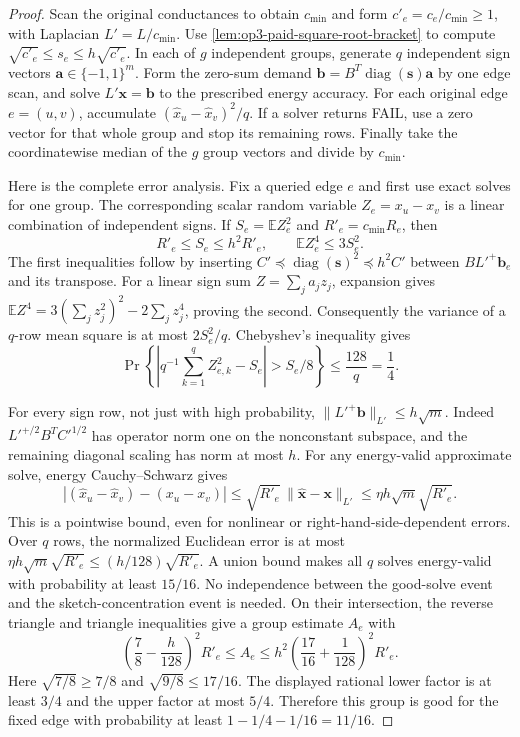 \begin{proof}
Scan the original conductances to obtain $c_{\min}$ and form
$c'_e=c_e/c_{\min}\geq1$, with Laplacian $L'=L/c_{\min}$.
Use \cref{lem:op3-paid-square-root-bracket} to compute
$\sqrt{c'_e}\leq s_e\leq h\sqrt{c'_e}$. In each of $g$ independent
groups, generate $q$ independent sign vectors
$\bm a\in\{-1,1\}^m$. Form the zero-sum demand
$\bm b=B^T\operatorname{diag}(\bm s)\bm a$ by one edge scan, and
solve $L'\bm x=\bm b$ to the prescribed energy accuracy.
For each original edge $e=(u,v)$, accumulate
$(\widehat x_u-\widehat x_v)^2/q$. If a solver returns
\textnormal{FAIL}, use a zero vector for that whole group and stop its
remaining rows. Finally take the coordinatewise median of the $g$
group vectors and divide by $c_{\min}$.

Here is the complete error analysis. Fix a queried edge $e$ and first
use exact solves for one group. The corresponding scalar random variable
$Z_e=x_u-x_v$ is a linear combination of independent signs. If
$S_e=\mathbb E Z_e^2$ and $R'_e=c_{\min}R_e$, then
\[
 R'_e\leq S_e\leq h^2R'_e,
 \qquad \mathbb E Z_e^4\leq3S_e^2.
\]
The first inequalities follow by inserting
$C'\preceq\operatorname{diag}(\bm s)^2\preceq h^2C'$
between $B L'^+\bm b_e$ and its transpose. For a linear sign sum
$Z=\sum_j a_j z_j$, expansion gives
$\mathbb E Z^4=3(\sum_jz_j^2)^2-2\sum_jz_j^4$, proving the second.
Consequently the variance of a $q$-row mean square is at most
$2S_e^2/q$. Chebyshev's inequality gives
\[
 \Pr\left\{\left|q^{-1}\sum_{k=1}^q Z_{e,k}^2-S_e\right|
       >S_e/8\right\}\leq\frac{128}{q}=\frac14.
\]

For every sign row, not just with high probability,
$\|L'^+\bm b\|_{L'}\leq h\sqrt m$. Indeed
$L'^{+/2}B^TC'^{1/2}$ has operator norm one on the nonconstant
subspace, and the remaining diagonal scaling has norm at most $h$.
For any energy-valid approximate solve, energy Cauchy--Schwarz gives
\[
 |(\widehat x_u-\widehat x_v)-(x_u-x_v)|
 \leq\sqrt{R'_e}\,\|\widehat{\bm x}-\bm x\|_{L'}
 \leq\eta h\sqrt m\sqrt{R'_e}.
\]
This is a pointwise bound, even for nonlinear or right-hand-side-dependent
errors. Over $q$ rows, the normalized Euclidean error is at most
$\eta h\sqrt m\sqrt{R'_e}\leq(h/128)\sqrt{R'_e}$.
A union bound makes all $q$ solves energy-valid with probability at
least $15/16$. No independence between the good-solve event and the
sketch-concentration event is needed. On their intersection, the reverse
triangle and triangle inequalities give a group estimate $A_e$ with
\[
 \left(\frac78-\frac h{128}\right)^2R'_e
 \leq A_e\leq h^2\left(\frac{17}{16}+\frac1{128}\right)^2R'_e.
\]
Here $\sqrt{7/8}\geq7/8$ and $\sqrt{9/8}\leq17/16$.
The displayed rational lower factor is at least $3/4$ and the upper
factor at most $5/4$. Therefore this group is good for the fixed edge
with probability at least $1-1/4-1/16=11/16$.


\end{proof}
